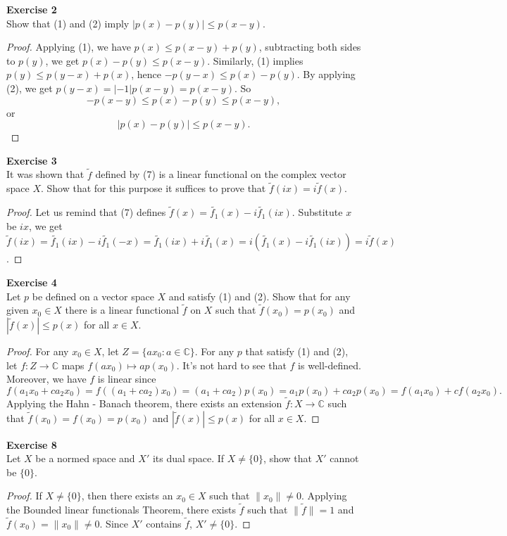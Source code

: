 \documentclass[12pt, a4paper]{article}
\theoremstyle{plain}
\newcommand{\C}{\mathbb{C}}
\newenvironment{exercise}[2][Exercise]
    { \begin{mdframed}[backgroundcolor=gray!20] \textbf{#1 #2} \\}
    {  \end{mdframed}}
\begin{document}
\begin{exercise}{2}
Show that (1) and (2) imply $|p(x)-p(y)|\leq p(x-y)$.
\end{exercise}
	\begin{proof}
	Applying (1), we have $p(x)\leq p(x-y)+p(y)$, subtracting both sides to $p(y)$, we get $p(x)-p(y)\leq p(x-y)$. Similarly, (1) implies $p(y) \leq p(y-x)+p(x)$, hence $-p(y-x)\leq p(x)-p(y)$. By applying (2), we get $p(y-x)=|-1|p(x-y)=p(x-y)$. So
	\[
	-p(x-y)\leq p(x)-p(y) \leq p(x-y),
	\]
	or
	\[
	|p(x)-p(y)|\leq p(x-y).
	\]
	\end{proof}

\begin{exercise}{3}
It was shown that $\tilde{f}$ defined by (7) is a linear functional on the complex vector space $X$. Show that for this purpose it suffices to prove that $\tilde{f}(ix)=i\tilde{f}(x)$.
\end{exercise}
	\begin{proof}
	Let us remind that (7) defines $\tilde{f}(x) = \tilde{f_1}(x)-i\tilde{f_1}(ix)$. Substitute $x$ be $ix$, we get $\tilde{f}(ix)=\tilde{f_1}(ix)-i\tilde{f_1}(-x) = \tilde{f_1}(ix)+i\tilde{f_1}(x) = i(\tilde{f_1}(x)-i\tilde{f_1}(ix))=i\tilde{f}(x)$.
	\end{proof}

\begin{exercise}{4}
Let $p$ be defined on a vector space $X$ and satisfy (1) and (2). Show that for any given $x_0\in X$ there is a linear functional $\tilde{f}$ on $X$ such that $\tilde{f}(x_0)=p(x_0)$ and $|\tilde{f}(x)|\leq p(x)$ for all $x\in X$. 
\end{exercise}
	\begin{proof}
	For any $x_0\in X$, let $Z=\{ax_0:a\in \C\}$. For any $p$ that satisfy (1) and (2), let $f:Z\rightarrow \C$ maps $f(ax_0)\mapsto ap(x_0)$. It's not hard to see that $f$ is well-defined. Moreover, we have $f$ is linear since
	\[
	f(a_1x_0 + ca_2x_0)=f((a_1+ca_2)x_0)=(a_1+ca_2)p(x_0) = a_1p(x_0)+ca_2p(x_0)=f(a_1x_0)+cf(a_2x_0).
	\]
	Applying the Hahn - Banach theorem, there exists an extension $\tilde{f}:X\rightarrow \C$ such that $\tilde{f}(x_0)=f(x_0)=p(x_0)$ and $|\tilde{f}(x)|\leq p(x)$ for all $x\in X$.
	\end{proof}

\begin{exercise}{8}
Let $X$ be a normed space and $X'$ its dual space. If $X\neq \{0\}$, show that $X'$ cannot be $\{0\}$.
\end{exercise}
	\begin{proof}
	If $X\neq \{0\}$, then there exists an $x_0\in X$ such that $\|x_0\|\neq 0$. Applying the Bounded linear functionals Theorem, there exists $\tilde{f}$ such that $\|\tilde{f}\|=1$ and $\tilde{f}(x_0)=\|x_0\|\neq 0$. Since $X'$ contains $\tilde{f}$, $X'\neq \{0\}$.
	\end{proof}
\end{document}
